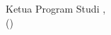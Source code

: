 \vspace*{0.2cm}
\begin{center}
     
    
    
    
    
    
    
        
    
    
        


\vspace{2em}
    Ketua Program Studi \program, \\[2.5cm]
    
    
    (\kaprodi)\\
    \kaprodiNIDN
    
    
\end{center}


\newpage